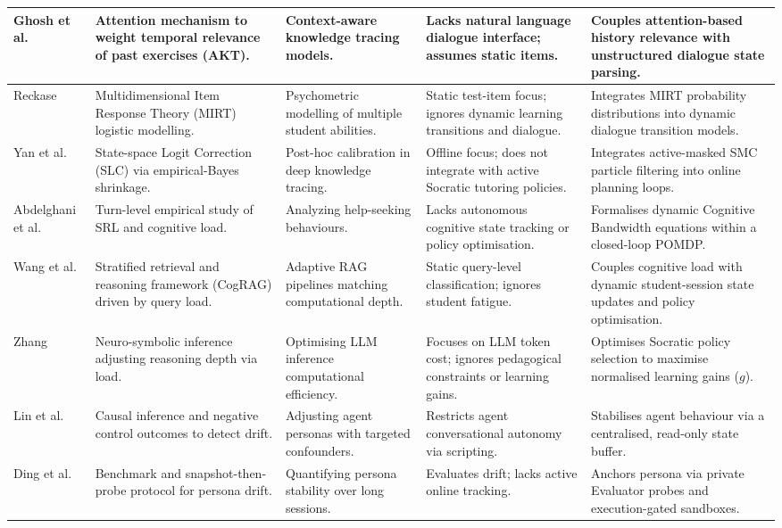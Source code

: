 \documentclass[11pt,a4paper]{report}
\begin{document}
{\begin{longtable}{@{}P{0.15\textwidth}P{0.22\textwidth}P{0.16\textwidth}P{0.18\textwidth}P{0.17\textwidth}@{}}
\midrule
Ghosh et al. \cite{ghosh2020context} & Attention mechanism to weight temporal relevance of past exercises (AKT). & Context-aware knowledge tracing models. & Lacks natural language dialogue interface; assumes static items. & Couples attention-based history relevance with unstructured dialogue state parsing. \\
\midrule
Reckase \cite{reckase2009multidimensional} & Multidimensional Item Response Theory (MIRT) logistic modelling. & Psychometric modelling of multiple student abilities. & Static test-item focus; ignores dynamic learning transitions and dialogue. & Integrates MIRT probability distributions into dynamic dialogue transition models. \\
\midrule
Yan et al. \cite{yan2026recovering} & State-space Logit Correction (SLC) via empirical-Bayes shrinkage. & Post-hoc calibration in deep knowledge tracing. & Offline focus; does not integrate with active Socratic tutoring policies. & Integrates active-masked SMC particle filtering into online planning loops. \\
\midrule
Abdelghani et al. \cite{abdelghani2026regulating} & Turn-level empirical study of SRL and cognitive load. & Analyzing help-seeking behaviours. & Lacks autonomous cognitive state tracking or policy optimisation. & Formalises dynamic Cognitive Bandwidth equations within a closed-loop POMDP. \\
\midrule
Wang et al. \cite{wang2026cograg} & Stratified retrieval and reasoning framework (CogRAG) driven by query load. & Adaptive RAG pipelines matching computational depth. & Static query-level classification; ignores student fatigue. & Couples cognitive load with dynamic student-session state updates and policy optimisation. \\
\midrule
Zhang \cite{zhang2025cognitive} & Neuro-symbolic inference adjusting reasoning depth via load. & Optimising LLM inference computational efficiency. & Focuses on LLM token cost; ignores pedagogical constraints or learning gains. & Optimises Socratic policy selection to maximise normalised learning gains ($g$). \\
\midrule
Lin et al. \cite{lin2026illusion} & Causal inference and negative control outcomes to detect drift. & Adjusting agent personas with targeted confounders. & Restricts agent conversational autonomy via scripting. & Stabilises agent behaviour via a centralised, read-only state buffer. \\
\midrule
Ding et al. \cite{ding2026contextecho} & Benchmark and snapshot-then-probe protocol for persona drift. & Quantifying persona stability over long sessions. & Evaluates drift; lacks active online tracking. & Anchors persona via private Evaluator probes and execution-gated sandboxes. \\

\end{longtable}}
\end{document}
